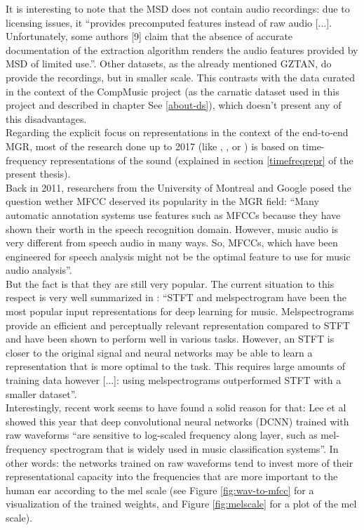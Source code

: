 It is interesting to note that the MSD does not contain audio recordings: due to licensing issues, it ``provides precomputed features instead of raw audio [...]. Unfortunately, some authors [9] claim that the absence of accurate documentation of the extraction algorithm renders the audio features provided by MSD of limited use.''\cite{stokowiec}. Other datasets, as the already mentioned GZTAN, do provide the recordings, but in smaller scale. This contrasts with the data curated in the context of the CompMusic project (as the carnatic dataset used in this project and described in chapter See \ref{about-ds}), which doesn't present any of this disadvantages.\\

Regarding the explicit focus on representations in the context of the end-to-end MGR, most of the research done up to 2017 (like \cite{ireland-mfcc}, \cite{haggblade}, \cite{belgium-mfcc} or \cite{choi-robustness}) is based on time-frequency representations of the sound (explained in section \ref{timefreqrepr} of the present thesis).\\

Back in 2011, researchers from the University of Montreal and Google posed the question wether MFCC deserved its popularity in the MGR field: ``Many automatic annotation systems use features such as MFCCs because they have shown their worth in the speech recognition domain. However, music audio is very different from speech audio in many ways. So, MFCCs, which have been engineered for speech analysis might not be the optimal feature to use for music audio analysis''\cite{montreal-mfcc}.\\

But the fact is that they are still very popular. The current situation to this respect is very well summarized in \cite{choi-robustness}: ``STFT and melspectrogram have been the most popular input representations for deep learning for music. Melspectrograms provide an efficient and perceptually relevant representation compared to STFT and have been shown to perform well in various tasks. However, an STFT is closer to the original signal and neural networks may be able to learn a representation that is more optimal to the task. This requires large amounts of training data however [...]: using melspectrograms outperformed STFT with a smaller dataset''.\\

Interestingly, recent work seems to have found a solid reason for that: Lee et al\cite{wavdeep} showed this year that deep convolutional neural networks (DCNN) trained with raw waveforms ``are sensitive to log-scaled frequency along layer, such as mel-frequency spectrogram that is widely used in music classification systems''. In other words: the networks trained on raw waveforms tend to invest more of their representational capacity into the frequencies that are more important to the human ear according to the mel scale (see Figure \ref{fig:wav-to-mfcc} for a visualization of the trained weights, and Figure \ref{fig:melscale} for a plot of the mel scale).\\

